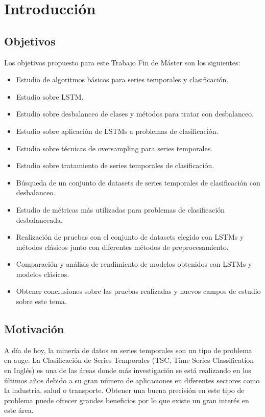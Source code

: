 \chapter{Introducción}
\section{Objetivos}
Los objetivos propuesto para este Trabajo Fin de Máster son los siguientes:
\begin{itemize}
	\item Estudio de algoritmos básicos para series temporales y clasificación.
	\item Estudio sobre LSTM.
	\item Estudio sobre desbalanceo de clases y métodos para tratar con desbalanceo.
	\item Estudio sobre aplicación de LSTMs a problemas de clasificación.
	\item Estudio sobre técnicas de oversampling para series temporales.
	\item Estudio sobre tratamiento de series temporales de clasificación.
	\item Búsqueda de un conjunto de datasets de series temporales de clasificación con desbalanceo.
	\item Estudio de métricas más utilizadas para problemas de clasificación desbalanceada.
	\item Realización de pruebas con el conjunto de datasets elegido con LSTMs y métodos clásicos junto con diferentes métodos de preprocesamiento.
	\item Comparación y análisis de rendimiento de modelos obtenidos con LSTMs y modelos clásicos.
	\item Obtener conclusiones sobre las pruebas realizadas y nuevos campos de estudio sobre este tema.
\end{itemize}
\newpage
\section{Motivación}
A día de hoy, la minería de datos en series temporales son un tipo de problema en auge. La Clasificación de Series Temporales (TSC, Time Series Classification en Inglés) es una de las áreas donde más investigación se está realizando en los últimos años debido a su gran número de aplicaciones en diferentes sectores como la industria, salud o transporte. Obtener una buena precisión en este tipo de problema puede ofrecer grandes beneficios por lo que existe un gran interés en este área.\newline

